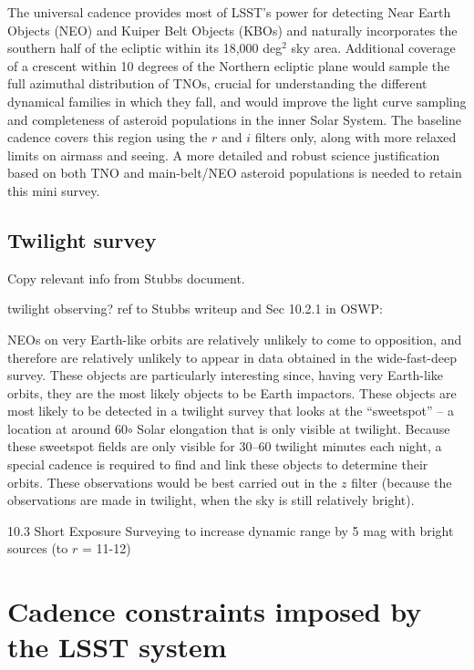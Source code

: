 \documentclass[DM,lsstdraft,toc,usenatbib]{lsstdoc}
\begin{document}
The universal cadence provides most of LSST’s power for detecting Near Earth Objects (NEO) and 
Kuiper Belt Objects (KBOs) and naturally incorporates the southern half of the ecliptic within its 
18,000 deg$^2$ sky area. Additional coverage of a crescent within 10 degrees of the Northern ecliptic 
plane would sample the full azimuthal distribution of TNOs, crucial for understanding the different 
dynamical families in which they fall, and would improve the light curve sampling and completeness
of asteroid populations in the inner Solar System. The baseline cadence covers this region using the 
$r$ and $i$ filters only, along with more relaxed limits on airmass and seeing. A more detailed 
and robust science justification based on both TNO and main-belt/NEO asteroid populations is 
needed to retain this mini survey. 



\subsection{Twilight survey} 

Copy relevant info from Stubbs document. 

twilight observing?  ref to Stubbs writeup and Sec 10.2.1 in OSWP: 

NEOs on very Earth-like orbits are relatively unlikely to come to opposition, and therefore are 
relatively unlikely to appear in data obtained in the wide-fast-deep survey. These objects are 
particularly interesting since, having very Earth-like orbits, they are the most likely objects to
be Earth impactors. These objects are most likely to be detected in a twilight survey that looks 
at the ``sweetspot'' -- a location at around 60$\circ$ Solar elongation that is only visible at 
twilight. Because these sweetspot fields are only visible for 30–60 twilight minutes each night, 
a special cadence is required to find and link these objects to determine their orbits. These 
observations would be best carried out in the $z$ filter (because the observations are made in 
twilight, when the sky is still relatively bright). 

10.3 Short Exposure Surveying to increase dynamic range by 5 mag with bright sources (to $r$ = 11-12) 


\section{Cadence constraints imposed by the LSST system} 
\end{document}
